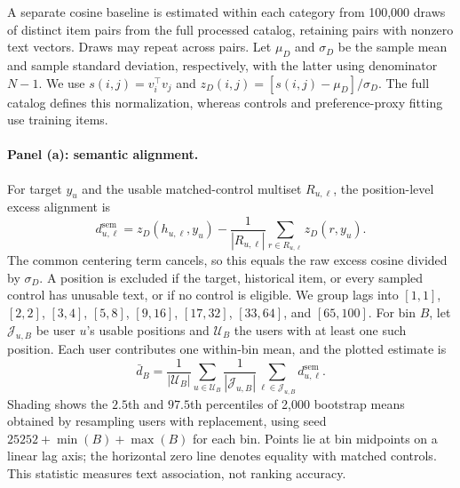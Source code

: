 \documentclass[11pt]{article}
\begin{document}
A separate cosine baseline is estimated within each category from 100,000 draws of distinct item pairs from the full processed catalog, retaining pairs with nonzero text vectors. Draws may repeat across pairs. Let $\mu_D$ and $\sigma_D$ be the sample mean and sample standard deviation, respectively, with the latter using denominator $N-1$. We use $s(i,j)=v_i^\top v_j$ and $z_D(i,j)=[s(i,j)-\mu_D]/\sigma_D$. The full catalog defines this normalization, whereas controls and preference-proxy fitting use training items.

\paragraph{Panel (a): semantic alignment.}
For target $y_u$ and the usable matched-control multiset $R_{u,\ell}$, the position-level excess alignment is
\begin{equation}
 d^{\mathrm{sem}}_{u,\ell}
 =z_D(h_{u,\ell},y_u)
 -\frac{1}{|R_{u,\ell}|}\sum_{r\in R_{u,\ell}}z_D(r,y_u).
 \label{eq:prelim_semantic}
\end{equation}
The common centering term cancels, so this equals the raw excess cosine divided by $\sigma_D$. A position is excluded if the target, historical item, or every sampled control has unusable text, or if no control is eligible. We group lags into $[1,1]$, $[2,2]$, $[3,4]$, $[5,8]$, $[9,16]$, $[17,32]$, $[33,64]$, and $[65,100]$. For bin $B$, let $\mathcal J_{u,B}$ be user $u$'s usable positions and $\mathcal U_B$ the users with at least one such position. Each user contributes one within-bin mean, and the plotted estimate is
\begin{equation}
 \bar d_B=\frac{1}{|\mathcal U_B|}\sum_{u\in\mathcal U_B}
 \frac{1}{|\mathcal J_{u,B}|}\sum_{\ell\in\mathcal J_{u,B}}
 d^{\mathrm{sem}}_{u,\ell}.
 \label{eq:prelim_bin_mean}
\end{equation}
Shading shows the $2.5$th and $97.5$th percentiles of 2,000 bootstrap means obtained by resampling users with replacement, using seed $25252+\min(B)+\max(B)$ for each bin. Points lie at bin midpoints on a linear lag axis; the horizontal zero line denotes equality with matched controls. This statistic measures text association, not ranking accuracy.
\end{document}
